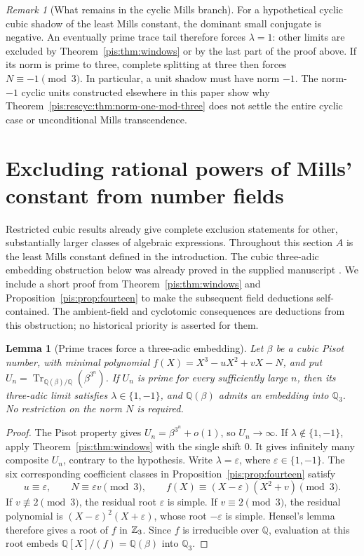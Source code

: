 \documentclass[11pt,a4paper]{article}
\newtheorem{lemma}[theorem]{Lemma}
\theoremstyle{definition}\newtheorem{definition}[theorem]{Definition}
\theoremstyle{remark}\newtheorem{remark}[theorem]{Remark}
\newcommand{\Q}{\mathbb Q}\newcommand{\R}{\mathbb R}
\newcommand{\Tr}{\operatorname{Tr}}\newcommand{\Nm}{\operatorname{N}}
\begin{document}
\begin{remark}[What remains in the cyclic Mills branch]
For a hypothetical cyclic cubic shadow of the least Mills
constant, the dominant small conjugate is negative. An eventually
prime trace tail therefore forces $\lambda=1$: other limits are
excluded by Theorem~\ref{pis:thm:windows} or by the last part of the
proof above. If its norm is prime to three, complete splitting at
three then forces $N\equiv-1\pmod3$. In particular, a unit
shadow must have norm $-1$. The norm-$-1$ cyclic units constructed
elsewhere in this paper show why Theorem~\ref{pis:rescyc:thm:norm-one-mod-three}
does not settle the entire cyclic case or unconditional Mills
transcendence.
\end{remark}


\section{Excluding rational powers of Mills' constant from number fields}
\label{pis:res:sec:fields}

Restricted cubic results already give complete exclusion statements for
other, substantially larger classes of algebraic expressions. Throughout
this section $A$ is the least Mills constant defined in the introduction.
The cubic three-adic embedding obstruction below was already proved in
the supplied manuscript \cite{Keio031}. We include a short proof from
Theorem~\ref{pis:thm:windows} and Proposition~\ref{pis:prop:fourteen} to make the
subsequent field deductions self-contained. The ambient-field and
cyclotomic consequences are deductions from this obstruction; no
historical priority is asserted for them.

\begin{lemma}[Prime traces force a three-adic embedding]
\label{pis:res:lem:prime-embedding}
Let $\beta$ be a cubic Pisot number, with minimal polynomial
$f(X)=X^3-uX^2+vX-N$, and put
$U_n=\Tr_{\Q(\beta)/\Q}(\beta^{3^n})$.
If $U_n$ is prime for every sufficiently large $n$, then its three-adic
limit satisfies $\lambda\in\{1,-1\}$, and $\Q(\beta)$ admits an
embedding into $\Q_3$. No restriction on the norm $N$ is required.
\end{lemma}
\begin{proof}
The Pisot property gives $U_n=\beta^{3^n}+o(1)$, so $U_n\to\infty$.
If $\lambda\notin\{1,-1\}$, apply Theorem~\ref{pis:thm:windows} with the
single shift $0$. It gives infinitely many composite $U_n$, contrary
to the hypothesis. Write $\lambda=\varepsilon$, where
$\varepsilon\in\{1,-1\}$. The six corresponding coefficient classes
in Proposition~\ref{pis:prop:fourteen} satisfy
\[
 u\equiv\varepsilon,\qquad N\equiv\varepsilon v\pmod3,
 \qquad
 f(X)\equiv(X-\varepsilon)(X^2+v)\pmod3.
\]
If $v\not\equiv2\pmod3$, the residual root $\varepsilon$ is simple.
If $v\equiv2\pmod3$, the residual polynomial is
$(X-\varepsilon)^2(X+\varepsilon)$, whose root $-\varepsilon$ is simple.
Hensel's lemma therefore gives a root of $f$ in $\mathbb Z_3$. Since $f$ is
irreducible over $\Q$, evaluation at this root embeds
$\Q[X]/(f)=\Q(\beta)$ into $\Q_3$.
\end{proof}
\end{document}
